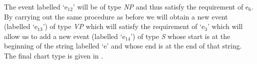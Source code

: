 The event labelled `e$_{12}$' will be of type \textit{NP} and thus
satisfy the requirement of e$_6$.  By carrying out the same procedure
as before we will obtain a new event (labelled `e$_{13}$') of type
\textit{VP} which will satisfy the requirement of `e$_3$' which will
allow us to add a new event (labelled `e$_{14}$') of type \textit{S}
whose start is at the beginning of the string labelled `e' and whose
end is at the end of that string.  The final chart type is given in
\nexteg{}.
\begin{ex} 
\end{ex}

